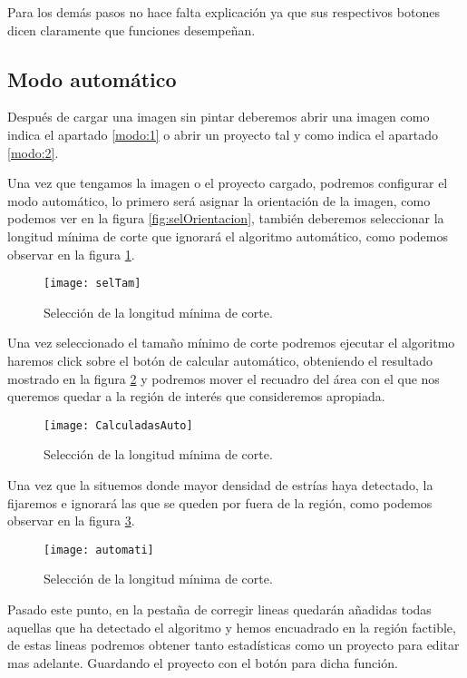 	
Para los demás pasos no hace falta explicación ya que sus respectivos botones dicen claramente que funciones desempeñan.	
	
\subsection{Modo automático}
Después de cargar una imagen sin pintar deberemos abrir una imagen como indica el apartado \ref{modo:1} o abrir un proyecto tal y como indica el apartado \ref{modo:2}.

Una vez que tengamos la imagen o el proyecto cargado, podremos configurar el modo automático, lo primero será asignar la orientación de la imagen, como podemos ver en la figura \ref{fig:selOrientacion}, también deberemos seleccionar la longitud mínima de corte que ignorará el algoritmo automático, como podemos observar en la figura \ref{fig:selTam}.

\begin{figure}[h]
\centering
\texttt{[image: selTam]}
\caption{Selección de la longitud mínima de corte.}
\label{fig:selTam}
\end{figure}

Una vez seleccionado el tamaño mínimo de corte podremos ejecutar el algoritmo haremos click sobre el botón de calcular automático, obteniendo el resultado mostrado en la figura \ref{fig:CalculadasAuto} y podremos mover el recuadro del área con el que nos queremos quedar a la región de interés que consideremos apropiada.

\begin{figure}[h]
\centering
\texttt{[image: CalculadasAuto]}
\caption{Selección de la longitud mínima de corte.}
\label{fig:CalculadasAuto}
\end{figure}

Una vez que la situemos donde mayor densidad de estrías haya detectado, la fijaremos e ignorará las que se queden por fuera de la región, como podemos observar en la figura \ref{fig:automati}.

\begin{figure}[h]
\centering
\texttt{[image: automati]}
\caption{Selección de la longitud mínima de corte.}
\label{fig:automati}
\end{figure}

Pasado este punto, en la pestaña de corregir lineas quedarán añadidas todas aquellas que ha detectado el algoritmo y hemos encuadrado en la región factible, de estas lineas podremos obtener tanto estadísticas como un proyecto para editar mas adelante. Guardando el proyecto con el botón para dicha función.

